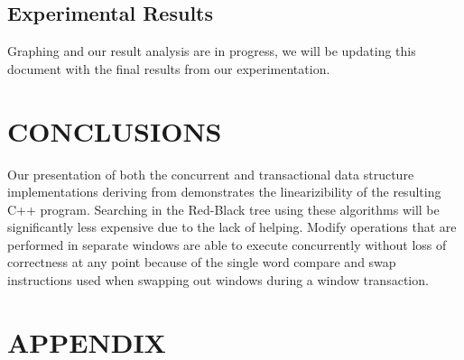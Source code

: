 \documentclass[letterpaper, 10 pt, conference]{ieeeconf}
\begin{document}
\subsection{Experimental Results}

Graphing and our result analysis are in progress, we will be updating this document with the final results from our experimentation.

	\section{CONCLUSIONS}
	
	Our presentation of both the concurrent and transactional data structure implementations deriving from \cite{c1} demonstrates the linearizibility of the resulting C++ program. Searching in the Red-Black tree using these algorithms will be significantly less expensive due to the lack of helping. Modify operations that are performed in separate windows are able to execute concurrently without loss of correctness at any point because of the single word compare and swap instructions used when swapping out windows during a window transaction.

	\section*{APPENDIX}
	
\end{document}
